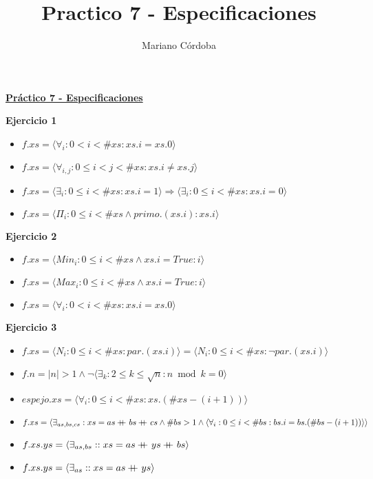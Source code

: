 \documentclass[12pt]{article}
\title{Practico 7 - Especificaciones}
\author{Mariano Córdoba}
\newcommand\doubleplus{+\kern-1.6ex+\kern0.8ex}
\begin{document}
\begin{center}
\large \underline{\textbf{Práctico 7 - Especificaciones}}
\end{center}

\textbf{Ejercicio 1}

\begin{itemize}
    \item $ f.xs = \langle \forall_i : 0 < i < \#xs : xs.i = xs.0 \rangle $
    \item $ f.xs = \langle \forall_{i,j} : 0 \le i < j < \#xs : xs.i \neq xs.j \rangle $
    \item $ f.xs = \langle \exists_i : 0 \le i < \#xs : xs.i = 1 \rangle \Rightarrow \langle\exists_i : 0 \le i < \#xs : xs.i = 0 \rangle  $
    \item $ f.xs = \langle \Pi_i : 0 \le i < \#xs \land primo.(xs.i) : xs.i \rangle $
\end{itemize}

\textbf{Ejercicio 2}

\begin{itemize}
    \item $ f.xs = \langle Min_i : 0 \le i < \#xs \land xs.i = True : i \rangle $
    \item $ f.xs = \langle Max_i : 0 \le i < \#xs \land xs.i = True : i \rangle $
    \item $ f.xs = \langle \forall_i : 0 < i < \#xs : xs.i = xs.0 \rangle $
\end{itemize}

\textbf{Ejercicio 3}

\begin{itemize}
    \item $ f.xs = \langle N_i : 0 \le i < \#xs : par.(xs.i) \rangle = \langle N_i : 0 \le i < \#xs : \neg par.(xs.i) \rangle$
    \item $ f.n = |n| > 1 \land \neg \langle \exists_k : 2 \le k \le \sqrt{n} : n \bmod k = 0 \rangle $
    \item $ espejo.xs = \langle \forall_i : 0 \le i < \#xs : xs.(\#xs - (i + 1)) \rangle $
    \item $ f.xs = \langle \exists_{as,bs,cs} : xs = as \doubleplus bs \doubleplus cs \land \#bs > 1 \land \langle \forall_i : 0 \le i < \#bs : bs.i = bs.(\#bs - (i + 1)) \rangle \rangle $
    \item $ f.xs.ys = \langle \exists_{as,bs} :: xs = as \doubleplus ys \doubleplus bs \rangle $
    \item $ f.xs.ys = \langle \exists_{as} :: xs = as \doubleplus ys \rangle $
\end{itemize}
\end{document}
